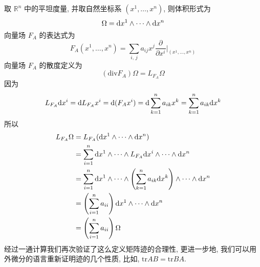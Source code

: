 \documentclass{book}
\newcommand{\md}{{\rm d}}
\begin{document}
        取 $\mathbb{R}^n$ 中的平坦度量, 并取自然坐标系 $(x^1,\dots,x^n)$, 则体积形式为
        \begin{equation*}
            \Omega = \md x^1\wedge\cdots\wedge\md x^n
        \end{equation*}
        向量场 $F_A$ 的表达式为
        \begin{equation*}
            F_A(x^1,\dots,x^n) = \sum_{i,\,j}a_{ij}x^j\frac{\partial}{\partial x^i}\Bigg|_{(x^1,\dots,x^n)}
        \end{equation*}
        向量场 $F_A$ 的散度定义为
        \begin{equation}\label{div}
            (\mathrm{div}F_A)\Omega = L_{F_A}\Omega
        \end{equation}
        因为
        \begin{equation*}
            L_{F_A}\md x^i = \md L_{F_A}x^i
            = \md (F_Ax^i)
            = \md \sum_{k=1}^{n}a_{ik}x^k
            = \sum_{k=1}^{n}a_{ik}\md x^k
        \end{equation*}
        所以
        \begin{align*}
            L_{F_A}\Omega &= L_{F_A}(\md x^1\wedge\cdots\wedge\md x^n) \\
            &= \sum_{i=1}^{n}\md x^1\wedge\cdots\wedge L_{F_A}\md x^i \wedge\cdots\wedge\md x^n \\
            &= \sum_{i=1}^{n}\md x^1\wedge\cdots\wedge\left(\sum_{k=1}^{n}a_{ik}\md x^k\right)\wedge\cdots\wedge\md x^n \\
            &= \left(\sum_{i=1}^{n}a_{ii}\right)\md x^1\wedge\cdots\wedge\md x^n \\
            &= \left(\sum_{i=1}^{n}a_{ii}\right)\Omega
        \end{align*}
        经过一通计算我们再次验证了这么定义矩阵迹的合理性, 更进一步地, 我们可以用外微分的语言重新证明迹的几个性质, 比如, $\mathrm{tr}AB = \mathrm{tr}BA$.
        
\end{document}
